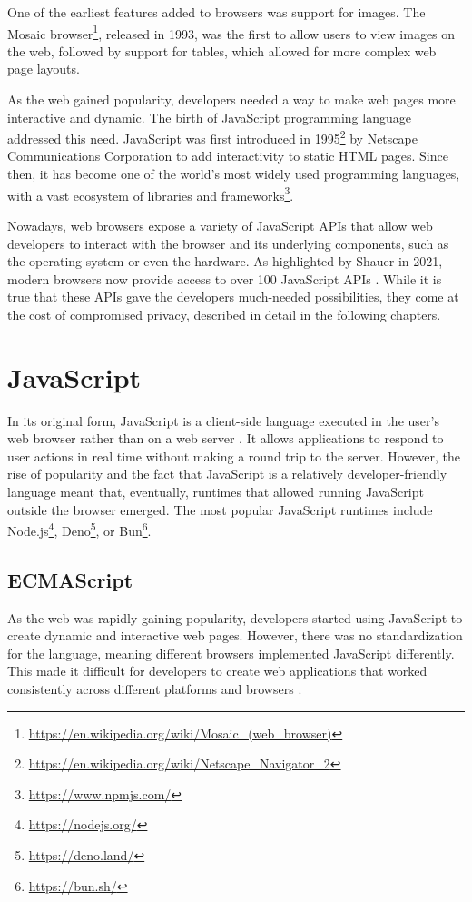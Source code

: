One of the earliest features added to browsers was support for images. The Mosaic browser\footnote{\url{https://en.wikipedia.org/wiki/Mosaic_(web_browser)}}, released in 1993, was the first to allow users to view images on the web, followed by support for tables, which allowed for more complex web page layouts.

As the web gained popularity, developers needed a way to make web pages more interactive and dynamic. The birth of JavaScript programming language addressed this need. JavaScript was first introduced in 1995\footnote{\url{https://en.wikipedia.org/wiki/Netscape_Navigator_2}} by Netscape Communications Corporation to add interactivity to static HTML pages. Since then, it has become one of the world's most widely used programming languages, with a vast ecosystem of libraries and frameworks\footnote{\url{https://www.npmjs.com/}}.

Nowadays, web browsers expose a variety of JavaScript APIs that allow web developers to interact with the browser and its underlying components, such as the operating system or even the hardware. As highlighted by Shauer in 2021, modern browsers now provide access to over 100 JavaScript APIs \cite{SchauerDP}. While it is true that these APIs gave the developers much-needed possibilities, they come at the cost of compromised privacy, described in detail in the following chapters.

\section{JavaScript}
\label{Section:JS}

In its original form, JavaScript is a client-side language executed in the user's web browser rather than on a web server \cite{JSDefinitiveGuide}. It allows applications to respond to user actions in real time without making a round trip to the server. However, the rise of popularity and the fact that JavaScript is a relatively developer-friendly language meant that, eventually, runtimes that allowed running JavaScript outside the browser emerged. The most popular JavaScript runtimes include Node.js\footnote{\url{https://nodejs.org/}}, Deno\footnote{\url{https://deno.land/}}, or Bun\footnote{\url{https://bun.sh/}}.

\subsection{ECMAScript}

As the web was rapidly gaining popularity, developers started using JavaScript to create dynamic and interactive web pages. However, there was no standardization for the language, meaning different browsers implemented JavaScript differently. This made it difficult for developers to create web applications that worked consistently across different platforms and browsers \cite{JSDefinitiveGuide}.

